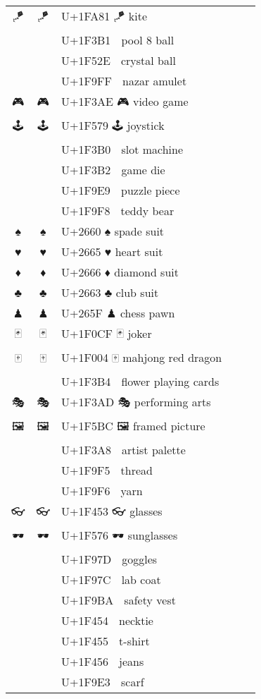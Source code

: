 \documentclass[a4paper,12pt]{article}
\newcommand{\fontA}[1]{{\fontspec[RawFeature={mode=harf,+dist,+ccmp}]{Segoe UI Emoji} #1}}
\newcommand{\fontB}[1]{{\fontspec[RawFeature={mode=harf,+dist,+ccmp}]{Noto Color Emoji} #1}}
\begin{document}
\begin{longtable}[c]{ccp{0.8\linewidth}}
\fontA{🪁}&\fontB{🪁}&U+1FA81 🪁 kite\\
\fontA{🎱}&\fontB{🎱}&U+1F3B1 🎱 pool 8 ball\\
\fontA{🔮}&\fontB{🔮}&U+1F52E 🔮 crystal ball\\
\fontA{🧿}&\fontB{🧿}&U+1F9FF 🧿 nazar amulet\\
\fontA{🎮}&\fontB{🎮}&U+1F3AE 🎮 video game\\
\fontA{🕹}&\fontB{🕹}&U+1F579 🕹 joystick\\
\fontA{🎰}&\fontB{🎰}&U+1F3B0 🎰 slot machine\\
\fontA{🎲}&\fontB{🎲}&U+1F3B2 🎲 game die\\
\fontA{🧩}&\fontB{🧩}&U+1F9E9 🧩 puzzle piece\\
\fontA{🧸}&\fontB{🧸}&U+1F9F8 🧸 teddy bear\\
\fontA{♠}&\fontB{♠}&U+2660 ♠ spade suit\\
\fontA{♥}&\fontB{♥}&U+2665 ♥ heart suit\\
\fontA{♦}&\fontB{♦}&U+2666 ♦ diamond suit\\
\fontA{♣}&\fontB{♣}&U+2663 ♣ club suit\\
\fontA{♟}&\fontB{♟}&U+265F ♟ chess pawn\\
\fontA{🃏}&\fontB{🃏}&U+1F0CF 🃏 joker\\
\fontA{🀄}&\fontB{🀄}&U+1F004 🀄 mahjong red dragon\\
\fontA{🎴}&\fontB{🎴}&U+1F3B4 🎴 flower playing cards\\
\fontA{🎭}&\fontB{🎭}&U+1F3AD 🎭 performing arts\\
\fontA{🖼}&\fontB{🖼}&U+1F5BC 🖼 framed picture\\
\fontA{🎨}&\fontB{🎨}&U+1F3A8 🎨 artist palette\\
\fontA{🧵}&\fontB{🧵}&U+1F9F5 🧵 thread\\
\fontA{🧶}&\fontB{🧶}&U+1F9F6 🧶 yarn\\
\fontA{👓}&\fontB{👓}&U+1F453 👓 glasses\\
\fontA{🕶}&\fontB{🕶}&U+1F576 🕶 sunglasses\\
\fontA{🥽}&\fontB{🥽}&U+1F97D 🥽 goggles\\
\fontA{🥼}&\fontB{🥼}&U+1F97C 🥼 lab coat\\
\fontA{🦺}&\fontB{🦺}&U+1F9BA 🦺 safety vest\\
\fontA{👔}&\fontB{👔}&U+1F454 👔 necktie\\
\fontA{👕}&\fontB{👕}&U+1F455 👕 t-shirt\\
\fontA{👖}&\fontB{👖}&U+1F456 👖 jeans\\
\fontA{🧣}&\fontB{🧣}&U+1F9E3 🧣 scarf\\

\end{longtable}
\end{document}
